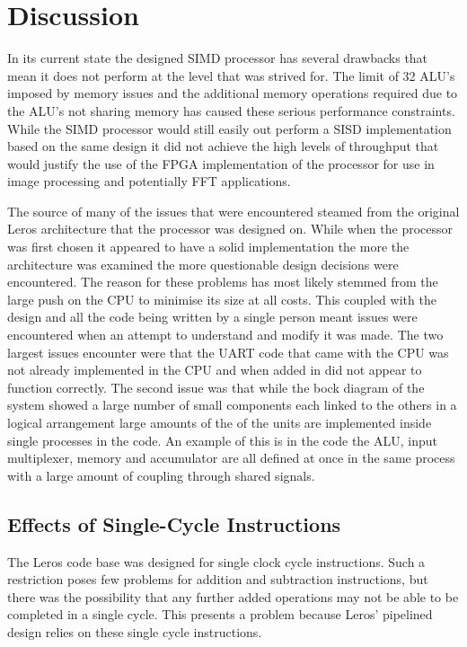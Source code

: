 \section{Discussion}
In its current state the designed SIMD processor has several drawbacks that mean
it does not perform at the level that was strived for. The limit of 32 ALU's
imposed by memory issues and the additional memory operations required due to
the ALU's not sharing memory has caused these serious performance constraints.
While the SIMD processor would still easily out perform a SISD implementation
based on the same design it did not achieve the high levels of throughput that
would justify the use of the FPGA implementation of the processor for use in
image processing and potentially FFT applications.  

The source of many of the issues that were encountered steamed from the original
Leros architecture that the processor was designed on. While when the processor
was first chosen it appeared to have a solid implementation the more the
architecture was examined the more questionable design decisions were
encountered. The reason for these problems has most likely stemmed from the
large push on the CPU to minimise its size at all costs. This coupled with the
design and all the code being written by a single person meant issues were
encountered when an attempt to understand and modify it was made. The two
largest issues encounter were that the UART code that came with the CPU was not
already implemented in the CPU and when added in did not appear to function
correctly. The second issue was that while the bock diagram of the system showed
a large number of small components each linked to the others in a logical
arrangement large amounts of the of the units are implemented inside single
processes in the code. An example of this is in the code the ALU, input
multiplexer, memory and accumulator are all defined at once in the same process
with a large amount of coupling through shared signals.  

\subsection{Effects of Single-Cycle Instructions}
The Leros code base was designed for single clock cycle instructions. Such a
restriction poses few problems for addition and subtraction instructions, but
there was the possibility that any further added operations may not be able to be
completed in a single cycle. This presents a problem because Leros' pipelined
design relies on these single cycle instructions.

